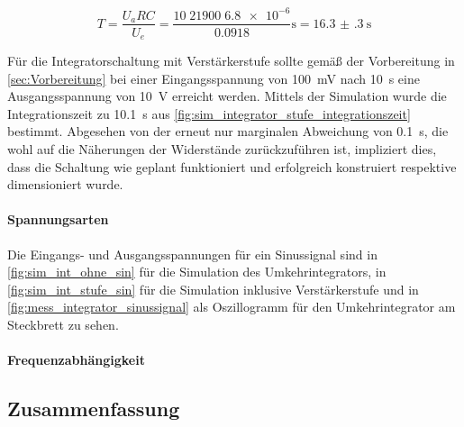 \documentclass[12pt,english,ngerman]{scrartcl}
\begin{document}
\begin{equation}
  T = \frac{U_{a}RC}{U_e} = \frac{\num{10}\; \num{21900} \; \num{6.8e-6}}{\num{0.0918}}\si{\second} = \SI{16.3(3)}{\second}
  \label{eq:theo_angepasst}
\end{equation}

Für die Integratorschaltung mit Verstärkerstufe sollte gemäß der Vorbereitung
in \autoref{sec:Vorbereitung} bei einer Eingangsspannung von
\SI{100}{\milli\volt} nach \SI{10}{\second} eine Ausgangsspannung von
\SI{10}{\volt} erreicht werden. Mittels der Simulation wurde die
Integrationszeit zu \SI{10,1}{\second} aus
\autoref{fig:sim_integrator_stufe_integrationszeit} bestimmt. Abgesehen von der
erneut nur marginalen Abweichung von \SI{0,1}{\second}, die wohl auf die
Näherungen der Widerstände zurückzuführen ist, impliziert dies, dass die
Schaltung wie geplant funktioniert und erfolgreich konstruiert respektive
dimensioniert wurde.

\paragraph{Spannungsarten}
Die Eingangs- und Ausgangsspannungen für ein Sinussignal sind in \autoref{fig:sim_int_ohne_sin} für
die Simulation des Umkehrintegrators, in \autoref{fig:sim_int_stufe_sin} für die Simulation
inklusive Verstärkerstufe und in \autoref{fig:mess_integrator_sinussignal} als Oszillogramm für den
Umkehrintegrator am Steckbrett zu sehen.

\paragraph{Frequenzabhängigkeit}




\subsection{Zusammenfassung}

\newpage

\printbibliography

\listoffigures

\listoftables
\end{document}
